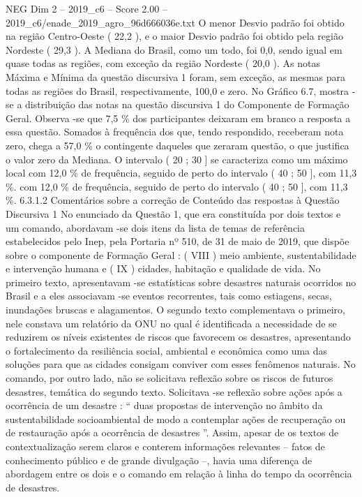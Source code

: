 \begin{textsample}{NEG Dim 2 – 2019\_c6 – Score 2.00 – 2019\_c6/enade\_2019\_agro\_96d666036e.txt}
O menor Desvio padrão foi obtido na região Centro-Oeste ( 22,2 ), e o maior Desvio padrão foi obtido pela região Nordeste ( 29,3 ).
A Mediana do Brasil, como um todo, foi 0,0, sendo igual em quase todas as regiões, com exceção da região Nordeste ( 20,0 ).
As notas Máxima e Mínima da questão discursiva 1 foram, sem exceção, as mesmas para todas as regiões do Brasil, respectivamente, 100,0 e zero.
No Gráfico 6.7, mostra -se a distribuição das notas na questão discursiva 1 do Componente de Formação Geral.
Observa -se que 7,5 \% dos participantes deixaram em branco a resposta a essa questão.
Somados à frequência dos que, tendo respondido, receberam nota zero, chega a 57,0 \% o contingente daqueles que zeraram questão, o que justifica o valor zero da Mediana.
O intervalo ( 20 ; 30 ] se caracteriza como um máximo local com 12,0 \% de frequência, seguido de perto do intervalo ( 40 ; 50 ], com 11,3 \%. com 12,0 \% de frequência, seguido de perto do intervalo ( 40 ; 50 ], com 11,3 \%. 6.3.1.2 Comentários sobre a correção de Conteúdo das respostas à Questão Discursiva 1 No enunciado da Questão 1, que era constituída por dois textos e um comando, abordavam -se dois itens da lista de temas de referência estabelecidos pelo Inep, pela Portaria nº 510, de 31 de maio de 2019, que dispõe sobre o componente de Formação Geral : ( VIII ) meio ambiente, sustentabilidade e intervenção humana e ( IX ) cidades, habitação e qualidade de vida.
No primeiro texto, apresentavam -se estatísticas sobre desastres naturais ocorridos no Brasil e a eles associavam -se eventos recorrentes, tais como estiagens, secas, inundações bruscas e alagamentos.
O segundo texto complementava o primeiro, nele constava um relatório da ONU no qual é identificada a necessidade de se reduzirem os níveis existentes de riscos que favorecem os desastres, apresentando o fortalecimento da resiliência social, ambiental e econômica como uma das soluções para que as cidades consigam conviver com esses fenômenos naturais.
No comando, por outro lado, não se solicitava reflexão sobre os riscos de futuros desastres, temática do segundo texto.
Solicitava -se reflexão sobre ações após a ocorrência de um desastre : “ duas propostas de intervenção no âmbito da sustentabilidade socioambiental de modo a contemplar ações de recuperação ou de restauração após a ocorrência de desastres ”.
Assim, apesar de os textos de contextualização serem claros e conterem informações relevantes – fatos de conhecimento público e de grande divulgação –, havia uma diferença de abordagem entre os dois e o comando em relação à linha do tempo da ocorrência de desastres.

\end{textsample}
